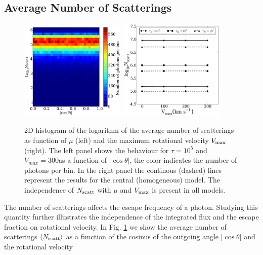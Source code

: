\subsection{Average Number of Scatterings}
\label{sec:scatterings}
\begin{figure}
\begin{center}
\includegraphics[width=0.45\textwidth]{../Figures/f12.pdf}
\includegraphics[width=0.45\textwidth]{../Figures/f13.pdf}
\end{center}
\caption{2D histogram of the logarithm of the average number of scatterings as function of $\mu$ (left) and the maximum rotational velocity $V_{\rm
max}$ (right). The left panel shows the behaviour for $\tau=10^{5}$ and
$V_{max}=300$\kms as a function of $\left|\cos\theta\right|$, the color indicates the number of photons per bin. In the
right panel the continous (dashed) lines represent the results for
the central (homogeneous) model. The independence of $N_{\rm scatt}$ with $\mu$ and $V_{\rm max}$ is
present in all models.
\label{fig:Nscatt} }
\end{figure}
The number of scatterings affects the escape frequency of a \ly
photon. Studying this quantity further illustrates the independence of
the integrated flux and the escape fraction on rotational velocity.
In Fig. \ref{fig:Nscatt} we show the average number of scatterings
$\langle N_{\rm scatt}\rangle$ as a function of the cosinus of the
outgoing angle $|\cos\theta|$ and the rotational velocity
